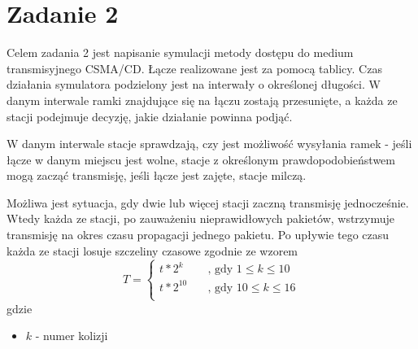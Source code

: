 \documentclass[titlepage]{article}
\begin{document}
\section{Zadanie 2}
Celem zadania 2 jest napisanie symulacji metody dostępu do medium transmisyjnego CSMA/CD. Łącze realizowane jest za pomocą tablicy. Czas działania symulatora podzielony jest na interwały o określonej długości. W danym interwale ramki znajdujące się na łączu zostają przesunięte, a każda ze stacji podejmuje decyzję, jakie działanie powinna podjąć. 

W danym interwale stacje sprawdzają, czy jest możliwość wysyłania ramek - jeśli łącze w danym miejscu jest wolne, stacje z określonym prawdopodobieństwem mogą zacząć transmisję, jeśli łącze jest zajęte, stacje milczą.

Możliwa jest sytuacja, gdy dwie lub więcej stacji zaczną transmisję jednocześnie. Wtedy każda ze stacji, po zauważeniu nieprawidłowych pakietów, wstrzymuje transmisję na okres czasu propagacji jednego pakietu. Po upływie tego czasu każda ze stacji losuje szczeliny czasowe zgodnie ze wzorem 
\[   
T = 
     \begin{cases}
       t * 2^k &\quad\text{, gdy }1 \leq k \leq 10\\
       t * 2^{10} &\quad\text{, gdy }10 \leq k \leq 16\\
     \end{cases}
\]
gdzie
\begin{itemize}
\itemsep0em
\item $k$ - numer kolizji
\end{itemize}
\end{document}
